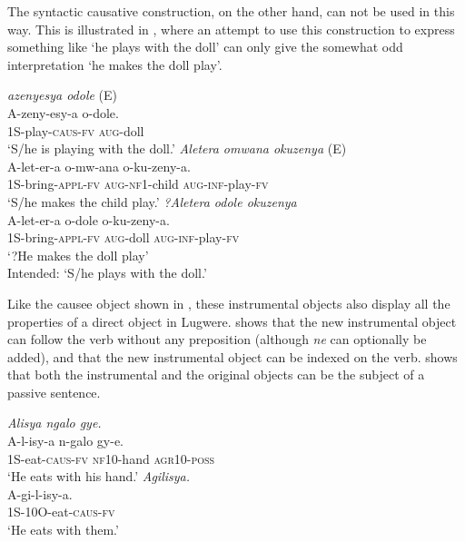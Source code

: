 \documentclass[output=paper,colorlinks,citecolor=brown,draftmode]{langscibook}
\begin{document}
The syntactic causative construction, on the other hand, can not be used in this way. This is illustrated in , where an attempt to use this construction to express something like `he plays with the doll' can only give the somewhat odd interpretation `he makes the doll play'.

\ea
\begin{xlist}   \label{ex:Saebo:doll}
 \ex \emph{azenyesya 		odole } (E)\\
  \gll A-zeny-esy-a 		o-dole.  \\ 
1S-play-\textsc{caus-fv}  \textsc{aug}-doll\\
    \glt  `S/he is playing with the doll.' 
     \ex \emph{Aletera 		omwana 	okuzenya } (E) \\
  \gll  A-let-er-a 		o-mw-ana 	o-ku-zeny-a. \\ 
1S-bring-\textsc{appl-fv} \textsc{aug-nf1}-child \textsc{aug-inf}-play-\textsc{fv}\\
    \glt  `S/he makes the child play.' 
     \ex \emph{?Aletera 		odole 		okuzenya} \\
  \gll  A-let-er-a 		o-dole 		o-ku-zeny-a. \\ 
1S-bring-\textsc{appl-fv} \textsc{aug}-doll \textsc{aug-inf}-play-\textsc{fv}\\
    \glt  `?He makes the doll play' \\
    Intended: `S/he plays with the doll.'
      \end{xlist}     
      \z

Like the causee object shown in , these instrumental objects also display all the properties of a direct object in Lugwere.  shows that the new instrumental object can follow the verb without any preposition (although \emph{ne} can optionally be added), and that the new instrumental object can be indexed on the verb.  shows that both the instrumental and the original objects can be the subject of a passive sentence. 

\ea
\begin{xlist}   \label{ex:Saebo:obj-prop}
 \ex \emph{Alisya ngalo gye.} \\
  \gll A-l-isy-a n-galo gy-e. \\ 
1S-eat-\textsc{caus-fv} \textsc{nf10}-hand \textsc{agr10-poss} \\
    \glt  `He eats with his hand.' 
     \ex \emph{Agilisya. } \\
  \gll A-gi-l-isy-a.  \\ 
1S-10O-eat-\textsc{caus-fv} \\
    \glt  `He eats with them.' 
      \end{xlist}     
      \z
\end{document}
